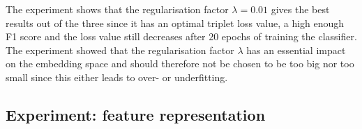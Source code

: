 \newline
\newline
The experiment shows that the regularisation factor $\lambda = 0.01$ gives the best results out of the three since it has an optimal triplet loss value, a high enough F1 score and the loss value still decreases after 20 epochs of training the classifier. The experiment showed that the regularisation factor $\lambda$ has an essential impact on the embedding space and should therefore not be chosen to be too big nor too small since this either leads to over- or underfitting.

\subsection{Experiment: feature representation}
\label{sub:Experiment-Feature-Representation}
